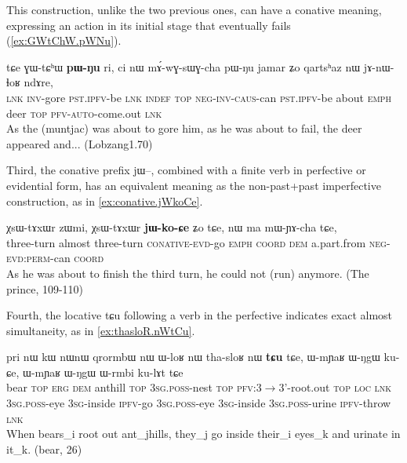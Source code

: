 \documentclass[oldfontcommands,oneside,a4paper,11pt]{article}
\newcommand{\ipa}[1]{{\phon \mbox{#1}}} %
\begin{document}
This construction, unlike the two previous ones, can have a conative meaning, expressing an action in its initial stage that eventually fails (\ref{ex:GWtChW.pWNu}).

     \begin{exe}
\ex \label{ex:GWtChW.pWNu}
\gll
\ipa{tɕe}  	\ipa{ɣɯ-tɕʰɯ}  	\ipa{\textbf{pɯ-ŋu}}  	\ipa{ri,}  	\ipa{ci}  	\ipa{nɯ}  	\ipa{mɤ́-wɣ-sɯɣ-cha}  	\ipa{pɯ-ŋu}  	\ipa{jamar}  	\ipa{ʑo}  	\ipa{qartsʰaz}  	\ipa{nɯ}  	\ipa{jɤ-nɯ-ɬoʁ}  	\ipa{ndɤre,}  \\
\textsc{lnk} \textsc{inv}-gore \textsc{pst.ipfv}-be \textsc{lnk} \textsc{indef} \textsc{top} \textsc{neg-inv-caus}-can  \textsc{pst.ipfv}-be about \textsc{emph} deer \textsc{top} \textsc{pfv-auto}-come.out \textsc{lnk} \\
\glt As the (muntjac) was about to gore him, as he was about to fail, the deer appeared and... (Lobzang1.70)
 \end{exe}

Third, the conative prefix \ipa{jɯ}--, combined with a finite verb  in perfective or evidential form, has an equivalent meaning as the non-past+past imperfective construction, as in \ref{ex:conative.jWkoCe}.

\begin{exe}
\ex \label{ex:conative.jWkoCe}
\gll 
\ipa{χsɯ-tɤxɯr}   	\ipa{zɯmi,}   	\ipa{χsɯ-tɤxɯr}   	\ipa{\textbf{jɯ-ko-ɕe}}   	\ipa{ʑo}   	   	\ipa{tɕe,}   	\ipa{nɯ}   	\ipa{ma}   	\ipa{mɯ-ɲɤ-cha}   	\ipa{tɕe,}   \\
three-turn almost three-turn \textsc{conative-evd}-go \textsc{emph} \textsc{coord} \textsc{dem} a.part.from \textsc{neg-evd:perm}-can \textsc{coord} \\
\glt As he was about to finish the third turn, he could not (run) anymore. (The prince, 109-110)
\end{exe}


Fourth, the locative \ipa{tɕu} following a verb in the perfective indicates exact almost simultaneity, as in \ref{ex:thasloR.nWtCu}.  
\begin{exe}
\ex \label{ex:thasloR.nWtCu}
\gll
\ipa{pri}   	\ipa{nɯ}   	\ipa{kɯ}   	\ipa{nɯnɯ}   	\ipa{qrormbɯ}   	\ipa{nɯ}   	\ipa{ɯ-loʁ}   	\ipa{nɯ}   	\ipa{tha-sloʁ}   	\ipa{nɯ}   	\ipa{\textbf{tɕu}}   	\ipa{tɕe,}   	  	\ipa{ɯ-mɲaʁ}   	\ipa{ɯ-ŋgɯ}   	\ipa{ku-ɕe,}   	\ipa{ɯ-mɲaʁ}   	\ipa{ɯ-ŋgɯ}   	\ipa{ɯ-rmbi}   	\ipa{ku-lɤt}   	\ipa{tɕe}   	\\
bear \textsc{top} \textsc{erg} \textsc{dem} anthill \textsc{top} \textsc{3sg.poss}-nest \textsc{top} \textsc{pfv}:3$\rightarrow$3'-root.out \textsc{top} \textsc{loc} \textsc{lnk} \textsc{3sg.poss}-eye \textsc{3sg}-inside \textsc{ipfv}-go \textsc{3sg.poss}-eye \textsc{3sg}-inside \textsc{3sg.poss}-urine \textsc{ipfv}-throw \textsc{lnk} \\
\glt When bears_i root out ant_jhills, they_j go inside their_i eyes_k and urinate in it_k.
(bear, 26)
\end{exe}
\end{document}
